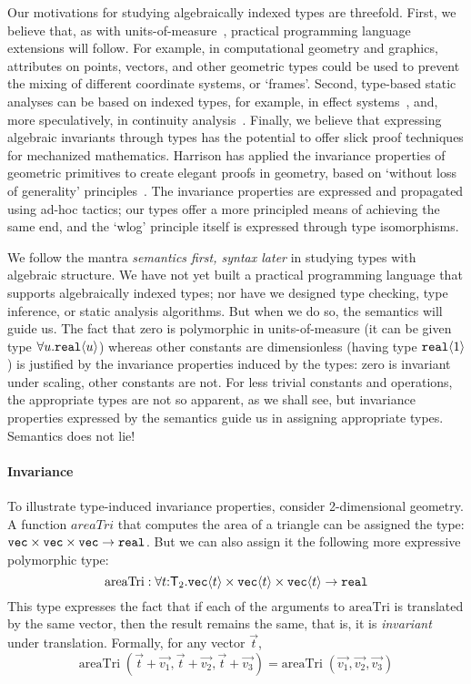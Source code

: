 Our motivations for studying algebraically indexed types are
threefold. First, we believe that, as with
units-of-measure~\cite{fsharp}, practical programming language
extensions will follow. For example, in computational geometry and
graphics, attributes on points, vectors, and other geometric types
could be used to prevent the mixing of different coordinate systems,
or `frames'. Second, type-based static analyses can be based on
indexed types, for example, in effect systems~\cite{benton06reading},
and, more speculatively, in continuity
analysis~\cite{chaudhuri10continuity}.  Finally, we believe that
expressing algebraic invariants through types has the potential to
offer slick proof techniques for mechanized
mathematics. Harrison has applied the
invariance properties of geometric primitives to create elegant proofs
in geometry, based on `without loss of
generality' principles~\cite{harrison09without}. The invariance properties are expressed 
and propagated using ad-hoc tactics; our types offer a more principled
means of achieving the same end, and the `wlog' principle itself
is expressed through type isomorphisms.

We follow the mantra \emph{semantics first, syntax later} in studying
types with algebraic structure. We have not yet built a practical
programming language that supports algebraically indexed types; nor
have we designed type checking, type inference, or static analysis
algorithms.  But when we do so, the semantics will guide us. The fact
that zero is polymorphic in units-of-measure (it can be given type $\forall
u.\textup{\texttt{real}}\langle u \rangle$) whereas other constants are dimensionless (having
type $\textup{\texttt{real}}\langle 1 \rangle$) is justified by the invariance properties
induced by the types: zero is invariant under scaling, other constants
are not. For less trivial constants and operations, the appropriate types are
not so apparent, as we shall see, but invariance properties expressed by
the semantics guide us in assigning appropriate types. Semantics does not lie!


\paragraph{Invariance}
To illustrate type-induced invariance properties, consider
2-dimensional geometry. 
A function $\mathit{areaTri}$ that computes the area of a triangle
can be assigned the type:
$\textup{\texttt{vec}}\times\textup{\texttt{vec}}\times\textup{\texttt{vec}}\to\texttt{real}$.
But we can also assign it the following more expressive polymorphic
type:
\[
\mathrm{areaTri} : \forall t\mathord:\mathsf{T}_2.
  \textup{\texttt{vec}}\langle t \rangle \times \textup{\texttt{vec}}\langle t \rangle \times \textup{\texttt{vec}}\langle t \rangle \to \texttt{real} \\
\]
This type expresses the fact that if each of the arguments to $\mathrm{areaTri}$
is translated by the same vector, then the result remains the same,
that is, it is \emph{invariant} under translation. Formally, for any 
vector $\vec t$,
\[
\mathrm{areaTri}\;(\vec{t} + \vec{v_1}, \vec{t} + \vec{v_2}, \vec{t} + \vec{v_3}) = 
\mathrm{areaTri}\;(\vec{v_1}, \vec{v_2}, \vec{v_3})
\]

